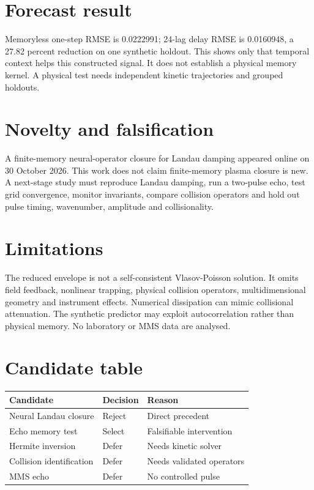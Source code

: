 \documentclass[11pt,a4paper]{article}
\begin{document}
\section{Forecast result}
Memoryless one-step RMSE is 0.0222991; 24-lag delay RMSE is 0.0160948, a 27.82 percent reduction on one synthetic holdout. This shows only that temporal context helps this constructed signal. It does not establish a physical memory kernel. A physical test needs independent kinetic trajectories and grouped holdouts.
\newpage
\section{Novelty and falsification}
A finite-memory neural-operator closure for Landau damping appeared online on 30 October 2026. This work does not claim finite-memory plasma closure is new. A next-stage study must reproduce Landau damping, run a two-pulse echo, test grid convergence, monitor invariants, compare collision operators and hold out pulse timing, wavenumber, amplitude and collisionality.
\newpage
\section{Limitations}
The reduced envelope is not a self-consistent Vlasov-Poisson solution. It omits field feedback, nonlinear trapping, physical collision operators, multidimensional geometry and instrument effects. Numerical dissipation can mimic collisional attenuation. The synthetic predictor may exploit autocorrelation rather than physical memory. No laboratory or MMS data are analysed.
\newpage
\section{Candidate table}
\begin{tabular}{lll}\toprule Candidate & Decision & Reason\\\midrule
Neural Landau closure & Reject & Direct precedent\\
Echo memory test & Select & Falsifiable intervention\\
Hermite inversion & Defer & Needs kinetic solver\\
Collision identification & Defer & Needs validated operators\\
MMS echo & Defer & No controlled pulse\\\bottomrule
\end{tabular}
\newpage
\end{document}
